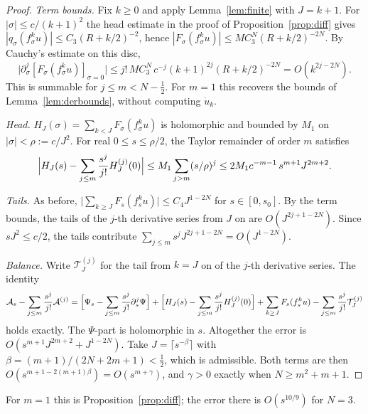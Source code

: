 \documentclass[11pt]{amsart}
\theoremstyle{definition}
\begin{document}
\begin{proof}
\emph{Term bounds.}  Fix $k\ge0$ and apply Lemma~\ref{lem:finite} with $J=k+1$.
For $|\sigma|\le c/(k+1)^2$ the head estimate in the proof of
Proposition~\ref{prop:diff} gives $|q_\sigma(f_\sigma^ku)|\le C_3(R+k/2)^{-2}$,
hence $|F_\sigma(f_\sigma^ku)|\le MC_3^N(R+k/2)^{-2N}$.  By Cauchy's estimate on
this disc,
\[
 \bigl|\partial_\sigma^j[F_\sigma(f_\sigma^ku)]_{\sigma=0}\bigr|
 \le j!\,MC_3^N\,c^{-j}(k+1)^{2j}(R+k/2)^{-2N}=O(k^{2j-2N}).
\]
This is summable for $j\le m<N-\tfrac12$.  For $m=1$ this recovers the bounds of
Lemma~\ref{lem:derbounds}, without computing $\dot u_k$.

\emph{Head.}  $H_J(\sigma)=\sum_{k<J}F_\sigma(f_\sigma^ku)$ is holomorphic and
bounded by $M_1$ on $|\sigma|<\rho:=c/J^2$.  For real $0\le s\le\rho/2$, the Taylor
remainder of order $m$ satisfies
\[
 \Bigl|H_J(s)-\sum_{j\le m}\frac{s^j}{j!}H_J^{(j)}(0)\Bigr|
 \le M_1\sum_{j>m}(s/\rho)^j\le2M_1c^{-m-1}\,s^{m+1}J^{2m+2}.
\]

\emph{Tails.}  As before,
$\bigl|\sum_{k\ge J}F_s(f_s^ku)\bigr|\le C_4J^{1-2N}$ for $s\in[0,s_0]$.  By
the term bounds, the tails of the $j$-th derivative series from $J$ on are
$O(J^{2j+1-2N})$.  Since $sJ^2\le c/2$, the tails contribute
$\sum_{j\le m}s^jJ^{2j+1-2N}=O(J^{1-2N})$.

\emph{Balance.}  Write $\mathcal T_J^{(j)}$ for the tail from $k=J$ on of the
$j$-th derivative series.  The identity
\[
 \mathcal A_s-\sum_{j\le m}\frac{s^j}{j!}\mathcal A^{(j)}
 =\Bigl[\Psi_s-\sum_{j\le m}\frac{s^j}{j!}\partial_s^j\Psi\Bigr]
 +\Bigl[H_J(s)-\sum_{j\le m}\frac{s^j}{j!}H_J^{(j)}(0)\Bigr]
 +\sum_{k\ge J}F_s(f_s^ku)-\sum_{j\le m}\frac{s^j}{j!}\mathcal T_J^{(j)}
\]
holds exactly.  The $\Psi$-part is holomorphic in $s$.  Altogether the error
is $O(s^{m+1}J^{2m+2}+J^{1-2N})$.  Take $J=\lceil s^{-\beta}\rceil$ with
$\beta=(m+1)/(2N+2m+1)<\tfrac12$, which is admissible.  Both terms are then
$O(s^{m+1-2(m+1)\beta})=O(s^{m+\gamma})$, and $\gamma>0$ exactly when
$N\ge m^2+m+1$.
\end{proof}

For $m=1$ this is Proposition~\ref{prop:diff}; the error there is
$O(s^{10/9})$ for $N=3$.
\end{document}

